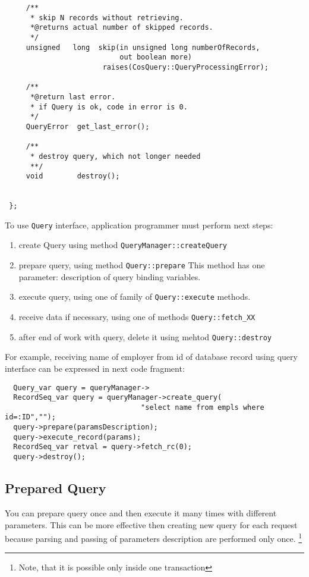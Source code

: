 \documentclass[10pt]{article}
\begin{document}
\begin{verbatim}
     /**
      * skip N records without retrieving.
      *@returns actual number of skipped records.
      */
     unsigned   long  skip(in unsigned long numberOfRecords,
                           out boolean more)
                       raises(CosQuery::QueryProcessingError);

     /**
      *@return last error.
      * if Query is ok, code in error is 0.
      */
     QueryError  get_last_error();

     /**
      * destroy query, which not longer needed
      **/
     void        destroy();


 };
\end{verbatim}

 To use \verb|Query| interface, application programmer must perform
 next steps:


 \begin{enumerate}
   \item create Query using method \verb|QueryManager::createQuery|
   \item prepare query, using method \verb|Query::prepare| 
   This method has one parameter: description of query binding variables.
   \item execute query, using one of family of \verb|Query::execute| methods.
   \item receive data if necessary, using one of methods 
  \verb|Query::fetch_XX|
   \item after end of work with query, delete it using mehtod \verb|Query::destroy|
 \end{enumerate}

  For example, receiving name of employer from id of database record 
 using query interface can be expressed in next code fragment:
 

\begin{verbatim}
  Query_var query = queryManager->
  RecordSeq_var query = queryManager->create_query(
                                "select name from empls where id=:ID","");
  query->prepare(paramsDescription); 
  query->execute_record(params);
  RecordSeq_var retval = query->fetch_rc(0); 
  query->destroy();
\end{verbatim}


\subsection { Prepared Query }

 You can prepare query once and then execute it many times
with different parameters. This can be more effective then creating
 new query for each request  because parsing and passing of parameters
description are performed only once. \footnote{Note, that it is possible 
 only inside one transaction }
\end{document}
